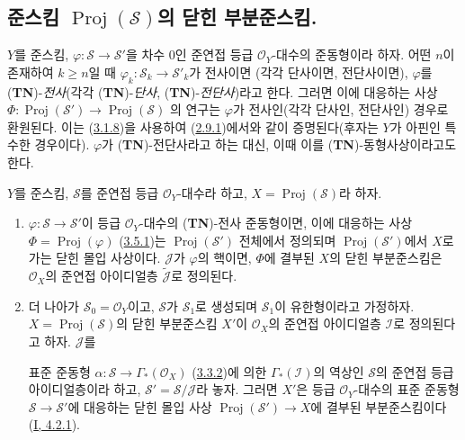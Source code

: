 \subsection{준스킴 $\operatorname{Proj}(\mathcal{S})$의 닫힌 부분준스킴.}
\label{subsection:II.3.6-ko}

\begin{env}[3.6.1]
\label{II.3.6.1-ko}
$Y$를 준스킴,
$\varphi:\mathcal{S}\to\mathcal{S}'$을 차수 $0$인 준연접 등급
$\mathcal{O}_Y$-대수의 준동형이라 하자. 어떤 $n$이 존재하여
$k\geq n$일 때 $\varphi_k:\mathcal{S}_k\to\mathcal{S}'_k$가 전사이면
(각각 단사이면, 전단사이면), $\varphi$를
(\textbf{TN})-\emph{전사}(각각 (\textbf{TN})-\emph{단사},
(\textbf{TN})-\emph{전단사})라고 한다. 그러면 이에 대응하는 사상
$\Phi:\operatorname{Proj}(\mathcal{S}')\to\operatorname{Proj}(\mathcal{S})$
의 연구는 $\varphi$가 전사인(각각 단사인, 전단사인) 경우로 환원된다.
이는 (\hyperref[II.3.1.8-ko]{3.1.8})을 사용하여
(\hyperref[II.2.9.1-ko]{2.9.1})에서와 같이 증명된다(후자는 $Y$가
아핀인 특수한 경우이다). $\varphi$가 (\textbf{TN})-전단사라고 하는
대신, 이때 이를 (\textbf{TN})-동형사상이라고도 한다.
\end{env}

\begin{proposition}[3.6.2]
\label{II.3.6.2-ko}
$Y$를 준스킴, $\mathcal{S}$를 준연접 등급 $\mathcal{O}_Y$-대수라 하고,
$X=\operatorname{Proj}(\mathcal{S})$라 하자.
\begin{enumerate}
  \item[\rm(i)] $\varphi:\mathcal{S}\to\mathcal{S}'$이 등급
    $\mathcal{O}_Y$-대수의 (\textbf{TN})-전사 준동형이면, 이에 대응하는
    사상 $\Phi=\operatorname{Proj}(\varphi)$
    (\hyperref[II.3.5.1-ko]{3.5.1})는
    $\operatorname{Proj}(\mathcal{S}')$ 전체에서 정의되며
    $\operatorname{Proj}(\mathcal{S}')$에서 $X$로 가는 닫힌 몰입 사상이다.
    $\mathcal{J}$가 $\varphi$의 핵이면, $\Phi$에 결부된 $X$의 닫힌
    부분준스킴은 $\mathcal{O}_X$의 준연접 아이디얼층
    $\widetilde{\mathcal{J}}$로 정의된다.
  \item[\rm(ii)] 더 나아가 $\mathcal{S}_0=\mathcal{O}_Y$이고,
    $\mathcal{S}$가 $\mathcal{S}_1$로 생성되며 $\mathcal{S}_1$이
    유한형이라고 가정하자. $X=\operatorname{Proj}(\mathcal{S})$의
    닫힌 부분준스킴 $X'$이 $\mathcal{O}_X$의 준연접 아이디얼층
    $\mathcal{I}$로 정의된다고 하자. $\mathcal{J}$를


    표준 준동형 $\alpha:\mathcal{S}\to\Gamma_*(\mathcal{O}_X)$
    (\hyperref[II.3.3.2-ko]{3.3.2})에 의한
    $\Gamma_*(\mathcal{I})$의 역상인 $\mathcal{S}$의 준연접 등급
    아이디얼층이라 하고, $\mathcal{S}'=\mathcal{S}/\mathcal{J}$라 놓자.
    그러면 $X'$은 등급 $\mathcal{O}_Y$-대수의 표준 준동형
    $\mathcal{S}\to\mathcal{S}'$에 대응하는 닫힌 몰입 사상
    $\operatorname{Proj}(\mathcal{S}')\to X$에 결부된 부분준스킴이다
    (\hyperref[I.4.2.1-ko]{I, 4.2.1}).
\end{enumerate}
\end{proposition}

